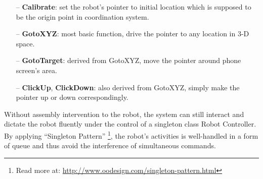 	\begin{itemize}
		\item[--] \textbf{Calibrate}: set the robot's pointer to initial location which is supposed to be the origin point in coordination system.
		\item[--] \textbf{GotoXYZ}: most basic function, drive the pointer to any location in 3-D space.
		\item[--] \textbf{GotoTarget}: derived from GotoXYZ, move the pointer around phone screen's area.
		\item[--] \textbf{ClickUp}, \textbf{ClickDown}: also derived from GotoXYZ, simply make the pointer up or down correspondingly.
	\end{itemize}

Without assembly intervention to the robot, the system can still interact and dictate the robot fluently under the control of a singleton class Robot Controller. By applying ``Singleton Pattern'' \footnote{Read more at: \url{http://www.oodesign.com/singleton-pattern.html}}, the robot's activities is well-handled in a form of queue and thus avoid the interference of simultaneous commands.